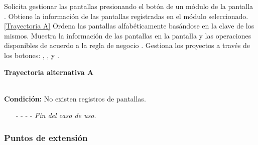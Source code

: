 \begin{UCtrayectoria}
	\UCpaso[\UCactor] Solicita gestionar las pantallas presionando el botón  de un módulo de la pantalla .
	\UCpaso[\UCsist] Obtiene la información de las pantallas registradas en el módulo seleccionado. \hyperlink{CU11:TAA}{[Trayectoria A]}
	\UCpaso[\UCsist] Ordena las pantallas alfabéticamente basándose en la clave de los mismos.
	\UCpaso[\UCsist] Muestra la información de las pantallas en la pantalla  y las operaciones disponibles de acuerdo a la regla de negocio .\label{CU11-P4}
	\UCpaso[\UCactor] Gestiona los proyectos a través de los botones: , \editar, \eliminar y . 
\end{UCtrayectoria}		
\hypertarget{CU11:TAA}{\textbf{Trayectoria alternativa A}}\\
\noindent \textbf{Condición:} No existen registros de pantallas.
\begin{enumerate}
	\UCpaso[\UCsist] Muestra el mensaje  en la pantalla  para indicar que no hay registros de pantallas para mostrar. \label{CU11-TA1}
	\UCpaso[\UCactor] Gestiona las pantallas a través del botón: . 
	\item[- -] - - {\em {Fin del caso de uso}}.%
\end{enumerate}



\subsubsection{Puntos de extensión}


